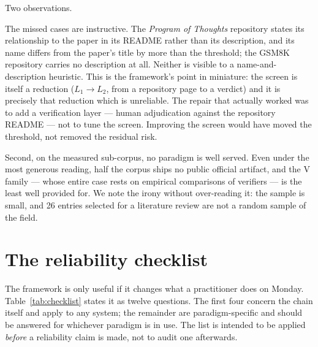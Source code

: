 \documentclass[11pt,a4paper]{article}
\newcommand{\paradigmV}{\textsf{V}}
\begin{document}
Two observations.

The missed cases are instructive. The \emph{Program of Thoughts} repository
\citep{chen2023pot} states its relationship to the paper in its README rather
than its description, and its name differs from the paper's title by more than
the threshold; the GSM8K repository \citep{cobbe2021gsm8k} carries no
description at all. Neither is visible to a name-and-description heuristic.
This is the framework's point in miniature: the screen is itself a reduction
($L_1\!\to\!L_2$, from a repository page to a verdict) and it is precisely that
reduction which is unreliable. The repair that actually worked was to add a
verification layer --- human adjudication against the repository README --- not
to tune the screen. Improving the screen would have moved the threshold, not
removed the residual risk.

Second, on the measured sub-corpus, no paradigm is well served. Even under the
most generous reading, half the corpus ships no public official artifact, and
the \paradigmV{} family --- whose entire case rests on empirical comparisons of
verifiers --- is the least well provided for. We note the irony without
over-reading it: the sample is small, and 26 entries selected for a literature
review are not a random sample of the field.

\section{The reliability checklist}
\label{sec:checklist}

The framework is only useful if it changes what a practitioner does on Monday.
Table~\ref{tab:checklist} states it as twelve questions. The first four concern
the chain itself and apply to any system; the remainder are paradigm-specific
and should be answered for whichever paradigm is in use. The list is intended to
be applied \emph{before} a reliability claim is made, not to audit one
afterwards.
\end{document}
